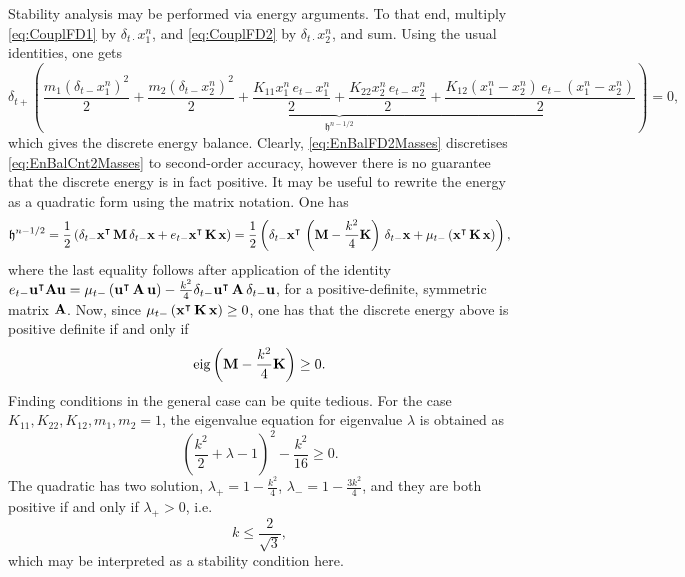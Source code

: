 \documentclass[11pt,twoside,a4paper,english]{book}
\newcommand{\etm}{e_{t-}}
\newcommand{\dtp}{\delta_{t+}}
\newcommand{\dtm}{\delta_{t-}}
\newcommand{\dtd}{\delta_{t\cdot}}
\newcommand{\mtm}{\mu_{t-}}
\begin{document}
Stability analysis may be performed via energy arguments. To that end, multiply \eqref{eq:CouplFD1} by $\dtd x^n_1$, and \eqref{eq:CouplFD2} by $\dtd x^n_2$, and sum. Using the usual identities, one gets
\begin{equation}\label{eq:EnBalFD2Masses}
\dtp \left(\underbrace{\frac{m_1(\dtm x^n_1)^2}{2} + \frac{m_2(\dtm x^n_2)^2}{2} + \frac{K_{11}x_1^n \, \etm x_1^n}{2}  + \frac{K_{22}x_2^n \, \etm x_2^n}{2} + \frac{K_{12}(x_1^n-x_2^n) \, \etm (x_1^n-x_2^n)}{2}}_{{\mathfrak h}^{n-1/2}}\right)  = 0,
\end{equation}
which gives the discrete energy balance. Clearly, \eqref{eq:EnBalFD2Masses} discretises \eqref{eq:EnBalCnt2Masses} to second-order accuracy, however there is no guarantee that the discrete energy is in fact positive. It may be useful to rewrite the energy as a quadratic form using the matrix notation. One has
\begin{equation}
\mathfrak{h}^{n-1/2} = \frac{1}{2}\left({\dtm {\bf x}}^{\intercal}\,{\bf M}\, {\dtm {\bf x}} + \etm{\bf x}^\intercal \,{\bf K}\, { {\bf x}}\right) = \frac{1}{2}\left( \dtm {\bf x}^{\intercal}\,\left({\bf M}-\frac{k^2}{4}{\bf K}\right)\, \dtm {\bf x} + \mtm \left({\bf x}^{\intercal}\,{\bf K}\, {\bf x}\right) \right),
\end{equation}
where the last equality follows after application of the  identity $\etm {\bf u}^\intercal  {\bf A} {\bf u}= \mtm \left({\bf u}^\intercal \,{\bf A}\, {\bf u}\right) - \frac{k^2}{4}\dtm{\bf u}^\intercal \,{\bf A}\, \dtm {\bf u}$, for a positive-definite, symmetric matrix $\bf A$. Now, since $\mtm \left({\bf x}^{\intercal}\,{\bf K}\,  {\bf x} \right) \geq 0$, one has that the discrete energy above is positive definite if and only if
\begin{equation}
\text{eig}\left({\bf M}-\frac{k^2}{4}{\bf K}\right) \geq 0.
\end{equation}
Finding conditions in the general case can be quite tedious. For the case  $K_{11},K_{22},K_{12},m_1,m_2=1$, the eigenvalue equation for eigenvalue $\lambda$ is obtained as
\begin{equation}
\left(\frac{k^2}{2} + \lambda - 1\right)^2 - \frac{k^2}{16}  \geq 0.
\end{equation}
The quadratic has two solution, $\lambda_+ = 1 - \frac{k^2}{4}$, $\lambda_- = 1 - \frac{3 k^2}{4}$, and they are both positive if and only if $\lambda_+ > 0$, i.e. 
\begin{equation}\label{eq:TwoMassesStabCond}
k \leq \frac{2}{\sqrt{3}},
\end{equation}
which may be interpreted as a stability condition here. 
\end{document}
